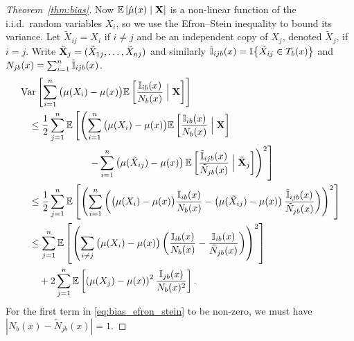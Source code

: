 \begin{proof}[Theorem~\ref{thm:bias}]

  Now $\mathbb{E} \left[ \hat\mu(x) \mid \mathbf{X} \right]$
  is a non-linear function of the i.i.d.\ random variables $X_i$,
  so we use the Efron--Stein inequality
  \citep{efron1981jackknife} to bound its variance.
  Let $\tilde X_{i j} = X_i$ if $i \neq j$ and be an
  independent copy of $X_j$, denoted $\tilde X_j$, if $i = j$.
  Write $\tilde {\mathbf{X}}_j = (\tilde X_{1j}, \ldots, \tilde X_{n j})$
  and similarly
  $\tilde {\mathbb{I}}_{i j b}(x) = \mathbb{I} \big\{ \tilde X_{i j} \in T_b(x) \big\}$
  and $N_{j b}(x) = \sum_{i=1}^{n} \tilde {\mathbb{I}}_{i j b}(x)$.
  \begin{align}
    \nonumber
    &\operatorname{Var} \left[
      \sum_{i=1}^{n}
      \big( \mu(X_i) - \mu(x) \big)
      \mathbb{E} \left[
        \frac{\mathbb{I}_{i b}(x)}{N_b(x)}
        \Bigm| \mathbf{X}
      \right]
    \right] \\
    \nonumber
    &\quad\leq
    \frac{1}{2}
    \sum_{j=1}^{n}
    \mathbb{E} \left[
      \left(
        \sum_{i=1}^{n}
        \big( \mu(X_i) - \mu(x) \big)
        \mathbb{E} \left[
          \frac{\mathbb{I}_{i b}(x)}{N_b(x)}
          \Bigm| \mathbf{X}
        \right]
        \right.\right. \\
        \nonumber
        &\qquad\qquad\qquad\quad\left.\left.
        - \sum_{i=1}^{n}
        \left( \mu(\tilde X_{i j}) - \mu(x) \right)
        \mathbb{E} \left[
          \frac{\tilde {\mathbb{I}}_{i j b}(x)}{\tilde N_{j b}(x)}
          \Bigm| \tilde {\mathbf{X}}_j
        \right]
      \right)^2
    \right] \\
    \nonumber
    &\quad\leq
    \frac{1}{2}
    \sum_{j=1}^{n}
    \mathbb{E} \left[
      \left(
        \sum_{i=1}^{n}
        \left(
          \big( \mu(X_i) - \mu(x) \big)
          \frac{\mathbb{I}_{i b}(x)}{N_b(x)}
          - \left( \mu(\tilde X_{i j}) - \mu(x) \right)
          \frac{\tilde {\mathbb{I}}_{i j b}(x)}{\tilde N_{j b}(x)}
        \right)
      \right)^2
    \right] \\
    \nonumber
    &\quad\leq
    \sum_{j=1}^{n}
    \mathbb{E} \left[
      \left(
        \sum_{i \neq j}
        \big( \mu(X_i) - \mu(x) \big)
        \left(
          \frac{\mathbb{I}_{i b}(x)}{N_b(x)} - \frac{\mathbb{I}_{i b}(x)}{\tilde N_{j b}(x)}
        \right)
      \right)^2
    \right] \\
    \label{eq:bias_efron_stein}
    &\qquad+
    2 \sum_{j=1}^{n}
    \mathbb{E} \left[
      \left( \mu(X_j) - \mu(x) \right)^2
      \frac{\mathbb{I}_{j b}(x)}{N_b(x)^2}
    \right].
  \end{align}
  For the first term in \eqref{eq:bias_efron_stein} to be non-zero,
  we must have $|N_b(x) - \tilde N_{j b}(x)| = 1$.

\end{proof}
